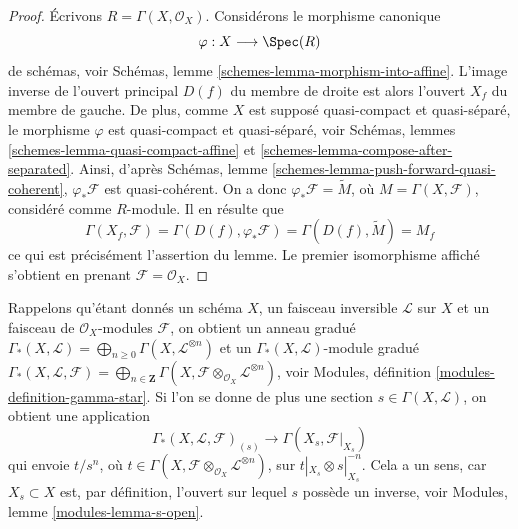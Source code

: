 \begin{proof}
Écrivons $R = \Gamma(X, \mathcal{O}_X)$. Considérons le morphisme canonique
$$
\varphi : X \longrightarrow \Spec(R)
$$
de schémas, voir
Schémas, lemme
\ref{schemes-lemma-morphism-into-affine}.
L'image inverse de l'ouvert principal $D(f)$ du membre
de droite est alors l'ouvert $X_f$ du membre de gauche.
De plus, comme $X$ est supposé quasi-compact et quasi-séparé,
le morphisme $\varphi$ est quasi-compact et quasi-séparé,
voir Schémas, lemmes \ref{schemes-lemma-quasi-compact-affine} et
\ref{schemes-lemma-compose-after-separated}. Ainsi,
d'après Schémas, lemme \ref{schemes-lemma-push-forward-quasi-coherent},
$\varphi_*\mathcal{F}$ est
quasi-cohérent. On a donc $\varphi_*\mathcal{F} = \widetilde M$,
où $M = \Gamma(X, \mathcal{F})$, considéré comme $R$-module.
Il en résulte que
$$
\Gamma(X_f, \mathcal{F}) =
\Gamma(D(f), \varphi_*\mathcal{F}) =
\Gamma(D(f), \widetilde M) = M_f
$$
ce qui est précisément l'assertion du lemme. Le premier isomorphisme
affiché s'obtient en prenant $\mathcal{F} = \mathcal{O}_X$.
\end{proof}

\noindent
Rappelons qu'étant donnés un schéma $X$, un faisceau inversible $\mathcal{L}$
sur $X$ et un faisceau de $\mathcal{O}_X$-modules $\mathcal{F}$,
on obtient un anneau gradué
$\Gamma_*(X, \mathcal{L}) =
\bigoplus\nolimits_{n \geq 0} \Gamma(X, \mathcal{L}^{\otimes n})$
et un $\Gamma_*(X, \mathcal{L})$-module gradué
$\Gamma_*(X, \mathcal{L}, \mathcal{F}) =
\bigoplus\nolimits_{n \in \mathbf{Z}}
\Gamma(X, \mathcal{F} \otimes_{\mathcal{O}_X} \mathcal{L}^{\otimes n})$,
voir Modules, définition \ref{modules-definition-gamma-star}.
Si l'on se donne de plus une section $s \in \Gamma(X, \mathcal{L})$, on
obtient une application
\begin{equation}
\label{equation-module-invert-s}
\Gamma_*(X, \mathcal{L}, \mathcal{F})_{(s)}
\longrightarrow
\Gamma(X_s, \mathcal{F}|_{X_s})
\end{equation}
qui envoie $t/s^n$, où
$t \in \Gamma(X, \mathcal{F} \otimes_{\mathcal{O}_X} \mathcal{L}^{\otimes n})$,
sur $t|_{X_s} \otimes s|_{X_s}^{-n}$. Cela a un
sens, car $X_s \subset X$ est, par définition, l'ouvert sur lequel
$s$ possède un inverse, voir Modules, lemme \ref{modules-lemma-s-open}.

